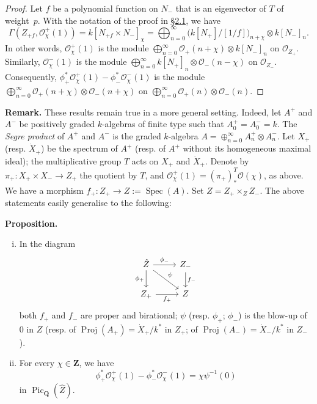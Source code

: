 \documentclass{article}
\newenvironment{itenv}[1]
  {\phantomsection\par\medskip\noindent\textbf{#1.}\itshape}
  {\par\medskip}
\newenvironment{rmenv}[1]
  {\phantomsection\par\medskip\noindent\textbf{#1.}\rmfamily}
  {\par\medskip}
\newcommand{\scr}[1]{{\mathscr{#1}}}
\newcommand{\QQ}{\mathbf{Q}}
\newcommand{\ZZ}{\mathbf{Z}}
\DeclareMathOperator{\Pic}{Pic}
\DeclareMathOperator{\Spec}{Spec}
\DeclareMathOperator{\Proj}{Proj}
\newcommand{\oldpage}[1]{\marginpar{\footnotesize$\Big\vert$ \textit{p.~#1}}}
\begin{document}
\begin{proof}
  Let $f$ be a polynomial function on $N_-$ that is an eigenvector of $T$ of weight~$p$.
  With the notation of the proof in \hyperref[2.1]{\S2.1}, we have
  \[
    \Gamma(Z_{+f},\scr{O}_\chi^+(1))
    = k[N_{+f}\times N_-]_\chi
    = \bigoplus_{n=0}^\infty\big(k[N_+]/[1/f]\big)_{n+\chi}\otimes k[N_-]_n.
  \]
  In other words, $\scr{O}_\chi^+(1)$ is the module $\bigoplus_{n=0}^\infty\scr{O}_+(n+\chi)\otimes k[N_-]_n$ on $\scr{O}_{Z_+}$.
  Similarly, $\scr{O}_\chi^-(1)$ is the module $\bigoplus_{n=0}^\infty k[N_+]_n\otimes\scr{O}_-(n-\chi)$ on $\scr{O}_{Z_-}$.
  Consequently, $\phi_+^*\scr{O}_\chi^+(1)-\phi_-^*\scr{O}_\chi^-(1)$ is the module $\bigoplus_{n=0}^\infty\scr{O}_+(n+\chi)\otimes\scr{O}_-(n+\chi)$ on $\bigoplus_{n=0}^\infty\scr{O}_+(n)\otimes\scr{O}_-(n)$.
\end{proof}

\begin{rmenv}{Remark}
  These results remain true in a more general setting.
  Indeed, let $A^+$ and $A^-$ be positively graded $k$-algebras of finite type such that $A_0^+=A_0^-=k$.
  The \emph{Segre product} \cite[Chapter~4]{GW} of $A^+$ and $A^-$ is the graded $k$-algebra $A=\oplus_{n=0}^\infty A_n^+\otimes A_n^-$.
  Let $X_+$ (resp. $\dot{X}_+$) be the spectrum of $A^+$ (resp. of $A^+$ without its homogeneous maximal ideal);
  the multiplicative group $T$ acts on $X_+$ and $\dot{X}_+$.
  Denote by $\pi_+\colon X_+\times X_-\to Z_+$ the quotient by $T$, and $\scr{O}_\chi^+(1)=(\pi_+)_*^T\scr{O}(\chi)$, as above.
  We have a morphism $f_+\colon Z_+\to Z:=\Spec(A)$.
  Set $\hat{Z}=Z_+\times_Z Z_-$.
  The above statements easily generalise to the following:
\end{rmenv}

\oldpage{521}

\begin{itenv}{Proposition}
  \begin{enumerate}[(i)]
    \item In the diagram
      \[
        \begin{tikzcd}
          \hat{Z} \ar[r,"\phi_-"] \ar[d,swap,"\phi_+"] \ar[dr,"\psi"]
          & Z_- \ar[d,"f_-"]
        \\Z_+ \ar[r,swap,"f_+"]
          & Z
        \end{tikzcd}
      \]
      both $f_+$ and $f_-$ are proper and birational;
      $\psi$ (resp. $\phi_+$; $\phi_-$) is the blow-up of $0$ in $Z$ (resp. of $\Proj(A_+)=\dot{X}_+/k^*$ in $Z_+$; of $\Proj(A_-)=\dot{X}_-/k^*$ in $Z_-$).
    \item For every $\chi\in\ZZ$, we have
      \[
        \phi_+^*\scr{O}_\chi^+(1) - \phi_-^*\scr{O}_\chi^-(1)
        = \chi\psi^{-1}(0)
      \]
      in $\Pic_{\QQ}(\hat{Z})$.
  \end{enumerate}
\end{itenv}
\end{document}
